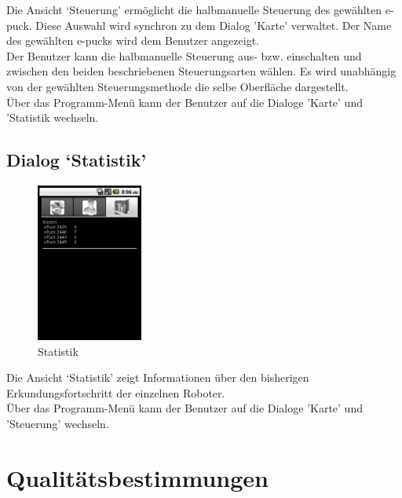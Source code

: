 \documentclass[10pt,a4paper]{article}
\let\oldsection\section
\renewcommand{\section}{\newpage \oldsection}
\begin{document}
			Die Ansicht `Steuerung' ermöglicht die halbmanuelle Steuerung des gewählten e-puck.	Diese Auswahl wird synchron zu
			dem Dialog 'Karte' verwaltet.	Der Name des gewählten e-pucks wird dem Benutzer angezeigt. \\ 
			Der Benutzer kann die halbmanuelle Steuerung	aus- bzw. einschalten und zwischen den beiden beschriebenen
			Steuerungsarten wählen. Es wird unabhängig von der	gewählten Steuerungsmethode die selbe Oberfläche dargestellt. \\
			Über das Programm-Menü kann der Benutzer auf die Dialoge 'Karte' und 'Statistik wechseln.

			\subsection{Dialog `Statistik'}
				\begin{figure}[h]
					  \centering
					\includegraphics[width=3.5cm]{screenshots/android3.png}
  					\caption{Statistik}
  				\end{figure}		
  				
  			Die Ansicht `Statistik' zeigt Informationen über den bisherigen Erkundungsfortschritt der einzelnen Roboter. \\
  			Über das Programm-Menü kann der Benutzer auf die Dialoge 'Karte' und 'Steuerung' wechseln.
			
	\section{Qualitätsbestimmungen}
		
\end{document}
